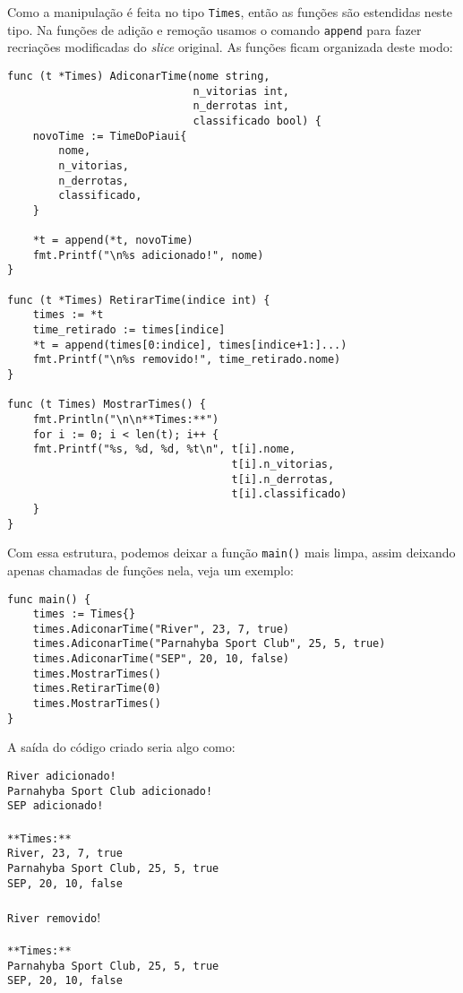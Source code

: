 \documentclass{SBCbookchapter}
\begin{document}
Como a manipulação é feita no tipo \texttt{Times}, então as funções são estendidas neste tipo. Na funções de adição e remoção usamos o comando \texttt{append} para fazer recriações modificadas do \textit{slice} original. As funções ficam organizada deste modo:

\begin{lstlisting}
func (t *Times) AdiconarTime(nome string,
							 n_vitorias int,
							 n_derrotas int,
							 classificado bool) {
	novoTime := TimeDoPiaui{
		nome,
		n_vitorias,
		n_derrotas,
		classificado,
	}
	
	*t = append(*t, novoTime)
	fmt.Printf("\n%s adicionado!", nome)
}

func (t *Times) RetirarTime(indice int) {
	times := *t
	time_retirado := times[indice]
	*t = append(times[0:indice], times[indice+1:]...)
	fmt.Printf("\n%s removido!", time_retirado.nome)
}

func (t Times) MostrarTimes() {
	fmt.Println("\n\n**Times:**")
	for i := 0; i < len(t); i++ {
	fmt.Printf("%s, %d, %d, %t\n", t[i].nome,
								   t[i].n_vitorias,
								   t[i].n_derrotas,
								   t[i].classificado)
	}
}
\end{lstlisting}

Com essa estrutura, podemos deixar a função \texttt{main()} mais limpa, assim deixando apenas chamadas de funções nela, veja um exemplo:

\begin{lstlisting}
func main() {
	times := Times{}
	times.AdiconarTime("River", 23, 7, true)
	times.AdiconarTime("Parnahyba Sport Club", 25, 5, true)
	times.AdiconarTime("SEP", 20, 10, false)
	times.MostrarTimes()
	times.RetirarTime(0)
	times.MostrarTimes()
}
\end{lstlisting}

A saída do código criado seria algo como:

\noindent\texttt{River adicionado!}\\
\texttt{Parnahyba Sport Club adicionado!}\\
\texttt{SEP adicionado!}\\ \\
\texttt{**Times:**}\\
\texttt{River, 23, 7, true}\\
\texttt{Parnahyba Sport Club, 25, 5, true}\\
\texttt{SEP, 20, 10, false}\\ \\
\texttt{River removido}!\\ \\
\texttt{**Times:**}\\
\texttt{Parnahyba Sport Club, 25, 5, true}\\
\texttt{SEP, 20, 10, false}\\
\end{document}
